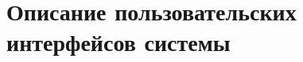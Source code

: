 \chapter{Описание пользовательских интерфейсов системы}
\begin{figure}[!htb]
\def\svgwidth{\columnwidth}
\caption{}
\label{motion_detection_3}
\end{figure}

\begin{figure}[!htb]
\def\svgwidth{\columnwidth}
\caption{}
\label{motion_detection_3}
\end{figure}

\begin{figure}[!htb]
\def\svgwidth{\columnwidth}
\caption{}
\label{motion_detection_3}
\end{figure}

